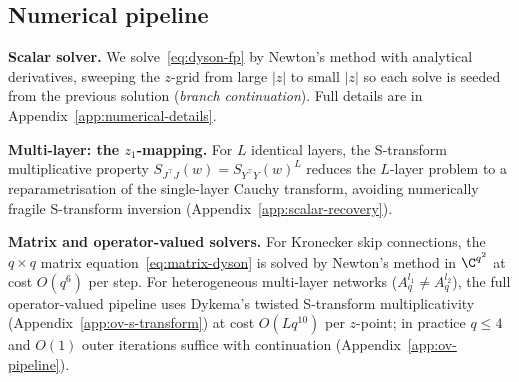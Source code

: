 \subsection{Numerical pipeline}\label{sec:numerical}

\noindent\textbf{Scalar solver.}
We solve~\eqref{eq:dyson-fp} by Newton's method with analytical derivatives, sweeping the $z$-grid from large $|z|$ to small $|z|$ so each solve is seeded from the previous solution (\emph{branch continuation}). Full details are in Appendix~\ref{app:numerical-details}.

\medskip
\noindent\textbf{Multi-layer: the $z_1$-mapping.}\label{sec:z1-mapping}
For $L$ identical layers, the S-transform multiplicative property $S_{J^\top J}(w) = S_{Y^\top Y}(w)^L$ reduces the $L$-layer problem to a reparametrisation of the single-layer Cauchy transform, avoiding numerically fragile S-transform inversion (Appendix~\ref{app:scalar-recovery}).

\medskip
\noindent\textbf{Matrix and operator-valued solvers.}\label{sec:matrix-dyson-numerics}
For Kronecker skip connections, the $q \times q$ matrix equation~\eqref{eq:matrix-dyson} is solved by Newton's method in $\C^{q^2}$ at cost $O(q^6)$ per step. For heterogeneous multi-layer networks ($A_q^{l_1} \neq A_q^{l_2}$), the full operator-valued pipeline uses Dykema's twisted S-transform multiplicativity~\cite{dykema2006multilinear} (Appendix~\ref{app:ov-s-transform}) at cost $O(Lq^{10})$ per $z$-point; in practice $q \leq 4$ and $O(1)$ outer iterations suffice with continuation (Appendix~\ref{app:ov-pipeline}).

\label{sec:num-dyson}\label{sec:ov-free-prob}\label{sec:matrix-dyson-theory}%
\label{sec:ov-multilayer}\label{sec:identical-vs-hetero}%
\label{sec:w-domain-newton}\label{sec:ov-pipeline-numerics}
